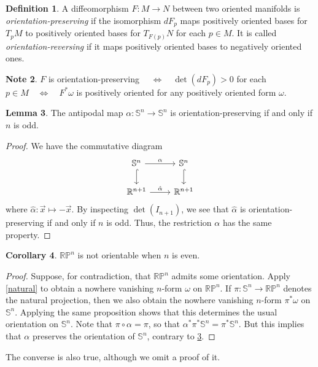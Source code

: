 \documentclass[10pt,letterpaper,cm]{nupset}
\theoremstyle{definition}
\newtheorem{definition}{Definition}[subsection]
\newtheorem{note}[definition]{Note}
\theoremstyle{theorem}
\newtheorem{lemma}[definition]{Lemma}
\newtheorem{corollary}[definition]{Corollary}
\theoremstyle{remark}
\newcommand{\R}{\mathbb R}
\newcommand{\RP}{\mathbb{RP}}
\renewcommand{\S}{\mathbb S}
\newcommand{\1}{\mathbf{1}}
\newcommand{\x}{\vec x}
\newcommand{\0}{\vec 0}
\begin{document}
\begin{definition}
A diffeomorphism $F: M \to N$ between two oriented manifolds is \textit{orientation-preserving} if the isomorphism $dF_p$ maps positively oriented bases for $T_pM$ to positively oriented bases for $T_{F(p)}N$ for each $p\in M$. It is called \textit{orientation-reversing} if it maps positively oriented bases to negatively oriented ones.
\end{definition}

\begin{note}
$F$ is orientation-preserving $\quad \iff \quad  \det(dF_p) >0$ for each $p \in M \quad \iff \quad F^{\ast}\omega$ is positively oriented for any positively oriented form $\omega$.
\end{note}

\begin{lemma}\label{antip}
The antipodal map $\alpha : \S^n \to \S^n$ is orientation-preserving  if and only if $n$ is odd.
\end{lemma}
\begin{proof}
We have the commutative diagram
\[
\begin{tikzcd}
\S^n \arrow[r, "\alpha"] \arrow[d, hook] & \S^n \arrow[d, hook] \\
\R^{n+1} \arrow[r, "\hat{\alpha}"] & \R^{n+1}
\end{tikzcd}
\]
where $\hat{\alpha} : \x \mapsto -\x$. By inspecting $\det(I_{n+1})$, we see that $\hat{\alpha}$ is orientation-preserving  if and only if $n$ is odd. Thus, the restriction $\alpha$ has the same property.
\end{proof}

\begin{corollary}
$\RP^n$ is not orientable when $n$ is even. 
\end{corollary}
\begin{proof}
Suppose, for contradiction, that $\RP^n$ admits some orientation. Apply \cref{natural} to obtain a nowhere vanishing $n$-form $\omega$ on $\RP^n$. If $\pi : \S^n \to \RP^n$ denotes the natural projection, then we also obtain the nowhere vanishing $n$-form $\pi^{\ast}\omega$ on $\S^n$. Applying the same proposition shows that this determines the usual orientation on $\S^n$. Note that $\pi \circ \alpha = \pi$, so that $\alpha^{\ast} \pi^{\ast} \S^n = \pi^{\ast}\S^n$. But this implies that $\alpha$ preserves the orientation of $\S^n$, contrary to \cref{antip}.
\end{proof}

The converse is also true, although we omit a proof of it.
\end{document}
